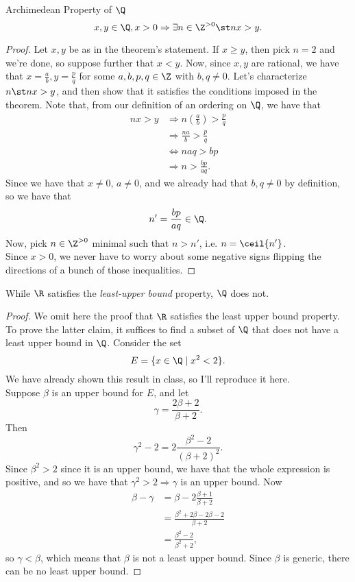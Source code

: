 \documentclass{assignment}
\begin{document}
\begin{theorem}{Archimedean Property of $\Q$}
  $$x,y\in\Q, x > 0 \Rightarrow \exists n\in\Z^{>0} \st nx > y.$$
\end{theorem}
\begin{proof}
  Let $x,y$ be as in the theorem's statement. If $x \geq y$, then pick $n = 2$ and we're done, so
  suppose further that $x < y$. Now, since $x,y$ are rational, we have that $x = \frac{a}{b}, y =
  \frac{p}{q}$ for some $a,b,p,q \in\Z$ with $b,q\neq 0$. Let's characterize $n\st nx>y$, and then 
  show that it satisfies the conditions imposed in the theorem. Note that, from our definition of
  an ordering on $\Q$, we have that 
  \begin{align*}
    nx > y &\Rightarrow n\left(\frac{a}{b}\right) > \frac{p}{q} \\
           &\Rightarrow \frac{na}{b} > \frac{p}{q} \\
           &\Leftrightarrow naq > bp \\
           &\Rightarrow n > \frac{bp}{aq}.
  \end{align*}
  Since we have that $x\neq 0$, $a \neq 0$, and we already had that $b,q\neq 0$ by definition, so 
  we have that $$n' = \frac{bp}{aq}\in\Q.$$ Now, pick $n\in\Z^{>0}$ minimal such that $n > n'$, i.e.
  $n = \ceil{n'}$. \\

  Since $x > 0$, we never have to worry about some negative signs flipping the directions of a bunch
  of those inequalities.
\end{proof}

\begin{theorem}
  While $\R$ satisfies the \emph{least-upper bound} property, $\Q$ does not.
\end{theorem}
\begin{proof}
  We omit here the proof that $\R$ satisfies the least upper bound property. To prove the latter claim,
it suffices to find a subset of $\Q$ that does not have a least upper bound in $\Q$. Consider the set
$$E = \{x\in\Q \mid x^2 < 2 \}.$$ We have already shown this result in class, so I'll reproduce it 
here. \\

Suppose $\beta$ is an upper bound for $E$, and let $$\gamma = \frac{2\beta + 2}{\beta + 2}.$$ Then
$$\gamma^2 - 2 = 2\frac{\beta^2 - 2}{(\beta + 2)^2}.$$ Since $\beta^2 > 2$ since it is an upper bound,
we have that the whole expression is positive, and so we have that $\gamma^2 > 2 \Rightarrow \gamma$ is 
an upper bound. Now 
\begin{align*}
  \beta - \gamma &= \beta - 2\frac{\beta + 1}{\beta + 2} \\
                 &= \frac{\beta^2 + 2\beta - 2\beta - 2}{\beta + 2} \\
                 &= \frac{\beta^2 - 2}{\beta^2 + 2},
\end{align*}
so $\gamma < \beta$, which means that $\beta$ is not a least upper bound. Since $\beta$ is generic,
there can be no least upper bound.
\end{proof}
\end{document}
